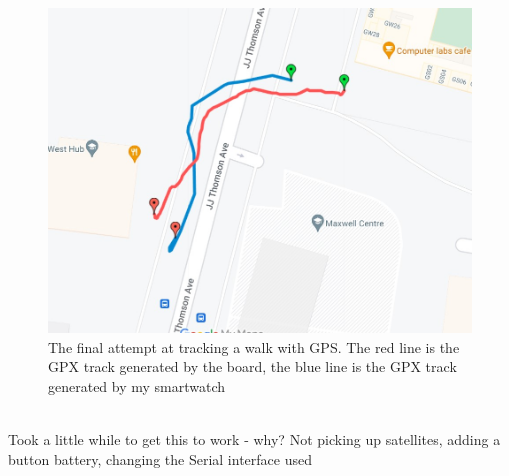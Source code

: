 \documentclass[12pt,a4paper]{report}
\begin{document}
\begin{figure}
\begin{center}
\includegraphics[scale=0.4]{gps2.jpg}
\end{center}
\caption{The final attempt at tracking a walk with GPS. The red line is the GPX track generated by the board, the blue line is the GPX track generated by my smartwatch \cite{googlemapsgeneral}}
\end{figure}\\ 

Took a little while to get this to work - why? Not picking up satellites, adding a button battery, changing the Serial interface used 
\end{document}
